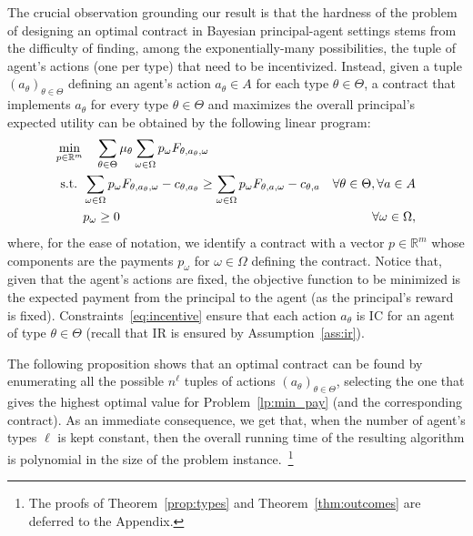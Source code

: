 The crucial observation grounding our result is that the hardness of the problem of designing an optimal contract in Bayesian principal-agent settings stems from the difficulty of finding, among the exponentially-many possibilities, the tuple of agent's actions (one per type) that need to be incentivized.
%
Instead, given a tuple $\left( a_\theta \right)_{\theta \in \Theta}$ defining an agent's action $a_\theta \in A$ for each type $\theta \in \Theta$, a contract that implements $a_\theta$ for every type $\theta \in \Theta$ and maximizes the overall principal's expected utility can be obtained by the following linear program:
%
\begin{subequations}\label{lp:min_pay}
	\begin{align}
		\min_{p \in \mathbb{R}^m} & \quad  \sum_{\theta \in \Theta} \mu_\theta \sum_{\omega \in \Omega} p_\omega F_{\theta,a_\theta,\omega}\\
		\textnormal{s.t. } & \sum_{\omega \in \Omega} p_\omega F_{\theta,a_\theta,\omega} -c_{\theta,a_\theta} \ge \sum_{\omega \in \Omega} p_\omega F_{\theta,a,\omega} -c_{\theta,a} & \forall \theta \in \Theta, \forall a \in A \label{eq:incentive}\\
		&p_\omega \ge 0 & \forall \omega \in \Omega,
	\end{align} 
\end{subequations}
%
where, for the ease of notation, we identify a contract with a vector $p \in \mathbb{R}^m$ whose components are the payments $p_\omega$ for $\omega \in \Omega$ defining the contract.
%
Notice that, given that the agent's actions are fixed, the objective function to be minimized is the expected payment from the principal to the agent (as the principal's reward is fixed).
%
Constraints~\eqref{eq:incentive} ensure that each action $a_\theta$ is IC for an agent of type $\theta \in \Theta$ (recall that IR is ensured by Assumption~\ref{ass:ir}).

The following proposition shows that an optimal contract can be found by enumerating all the possible $n^\ell$ tuples of actions $\left( a_\theta \right)_{\theta \in \Theta}$, selecting the one that gives the highest optimal value for Problem~\eqref{lp:min_pay} (and the corresponding contract).
%
As an immediate consequence, we get that, when the number of agent's types $\ell$ is kept constant, then the overall running time of the resulting algorithm is polynomial in the size of the problem instance.~\footnote{The proofs of Theorem~\ref{prop:types} and Theorem~\ref{thm:outcomes} are deferred to the Appendix.}

